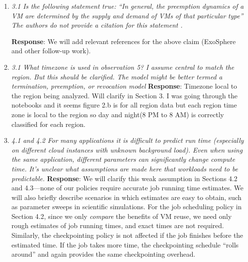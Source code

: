 \documentclass{article}
\newcommand{\resp}[1]{\textbf{Response}: #1}
\newcommand{\revmade}[1]{\textbf{Revision Made}: #1}
\begin{document}
\begin{enumerate}


\item \emph{3.1 Is the following statement true: “In general, the preemption dynamics of a VM are determined by the supply and demand of VMs of that particular type” The authors do not provide a citation for this statement .}

\resp{We will add relevant references for the above claim (ExoSphere and other follow-up work).}


\item \emph{3.1 What timezone is used in observation 5? I assume central to match the region. But this should be clarified.
The model might be better termed a termination, preemption, or revocation model}
\resp{Timezone local to the region being analyzed. Will clarify in Section 3.
I was going through the notebooks and it seems figure 2.b is for all region data but each region time zone is local to the region so day and night(8 PM to 8 AM) is correctly classified for each region.
}





\item \emph{4.1 and 4.2 For many applications it is difficult to predict run time (especially on different cloud instances with unknown background load). Even when using the same application, different parameters can significantly change compute time. It's unclear what assumptions are made here that workloads need to be predictable.
  }
  \resp{We will clarify this weak assumption in Sections 4.2 and 4.3---none of our policies require accurate job running time estimates. We will also briefly describe scenarios in which estimates are easy to obtain, such as parameter sweeps in scientific simulations. 
    For the job scheduling policy in Section 4.2, since we only \emph{compare} the benefits of VM reuse, we need only rough estimates of job running times, and exact times are not required. 
    Similarly, the checkpointing policy is not affected  if the job finishes before the estimated time. If the job takes more time, the checkpointing schedule ``rolls around'' and again provides the same checkpointing overhead.
  }



\end{enumerate}
\end{document}
